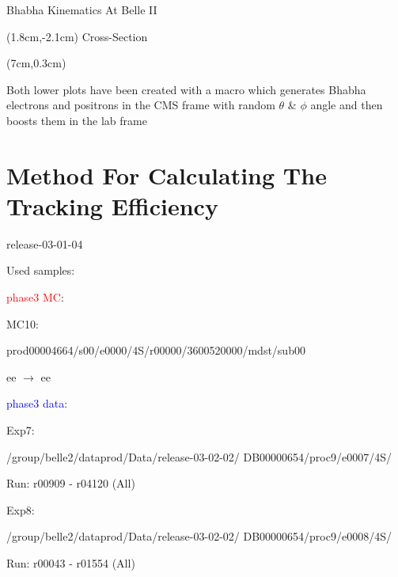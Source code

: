 \documentclass[8pt]{beamer}
\begin{document}
\begin{frame}{Bhabha Kinematics At Belle II}
\begin{textblock*}{4cm}(1.8cm,-2.1cm)
	Cross-Section
\end{textblock*}

\begin{textblock*}{4.7cm}(7cm,0.3cm)
	\begin{mybox}
		\footnotesize{
		Both lower plots have been created with a macro which generates Bhabha electrons and positrons in the CMS frame with random $\theta$ \& $\phi$ angle and then boosts them in the lab frame}
	\end{mybox}
\end{textblock*}




\end{frame}




\AtBeginSection{}
\section{Method For Calculating The Tracking Efficiency}
{
\begin{frame}[noframenumbering]
	\sectionpage
	\begin{itemize}
		\normalsize{

		\item release-03-01-04
		\item Used samples:
		\begin{itemize}
			\normalsize{
			
			\item[] \textcolor{red}{phase3 MC}: 
			
			\item MC10: 
			
			\begin{itemize}
				\normalsize{
			\item[] prod00004664/s00/e0000/4S/r00000/3600520000/mdst/sub00
			
			ee $\rightarrow$ ee
		}
			\end{itemize}

			\item[] \textcolor{blue}{phase3 data}: 
			\begin{itemize}
				\normalsize{
			\item Exp7:
			
			/group/belle2/dataprod/Data/release-03-02-02/ DB00000654/proc9/e0007/4S/
			
			Run: r00909 - r04120 (All)
			
			\item Exp8:
			
			/group/belle2/dataprod/Data/release-03-02-02/ DB00000654/proc9/e0008/4S/
			
			Run: r00043 - r01554 (All)
			
			}
		\end{itemize}
		
	}
		\end{itemize}
	}
	\end{itemize}
	
	
\end{frame}

}
\end{document}
